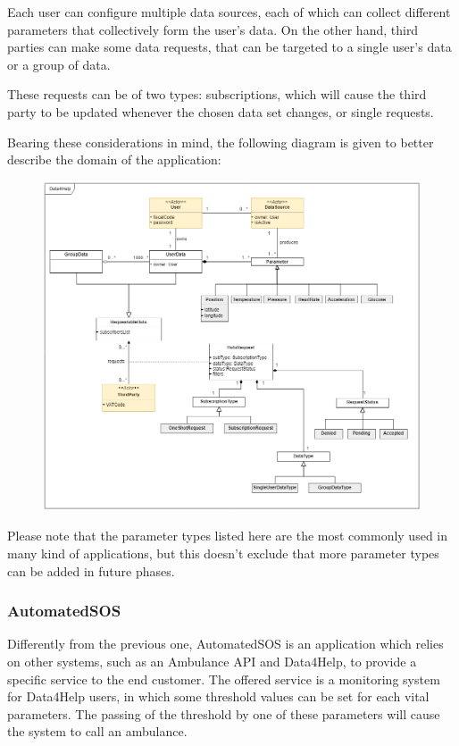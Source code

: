 Each user can configure multiple data sources, each of which can collect different parameters that collectively form the user's data. On the other hand, third parties can make some data requests, that can be targeted to a single user's data or a group of data.

These requests can be of two types: subscriptions, which will cause the third party to be updated whenever the chosen data set changes, or single requests.

Bearing these considerations in mind, the following diagram is given to better describe the domain of the application:

\begin{figure}[h!]
	\centering
	\includegraphics[width = \linewidth] {../Diagrams/ClassDiagram-General.png}\\[1.0 cm]
\end{figure}

Please note that the parameter types listed here are the most commonly used in many kind of applications, but this doesn't exclude that more parameter types can be added in future phases.
\newpage

\subsubsection{AutomatedSOS}
Differently from the previous one, AutomatedSOS is an application which relies on other systems, such as an Ambulance API and Data4Help, to provide a specific service to the end customer. 
The offered service is a monitoring system for Data4Help users, in which some threshold values can be set for each vital parameters. The passing of the threshold by one of these parameters will cause the system to call an ambulance.

